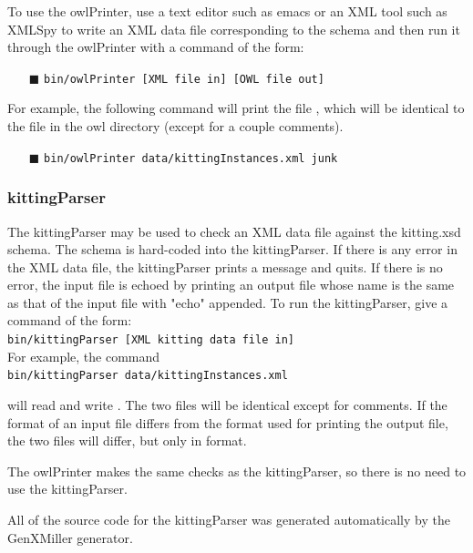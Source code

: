To use the owlPrinter, use a text editor such as emacs or an XML tool such as XMLSpy to write an XML data file corresponding to the  schema and then run it through the owlPrinter with a command of the form:
\begin{itemize}
 \item[\textcolor{BrickRed}{$\blacksquare$}] \texttt{bin/owlPrinter [XML file in] [OWL file out]}
\end{itemize}

For example, the following command will print the file , which will be identical to the  file in the owl directory (except for a couple comments).
\begin{itemize}
 \item[\textcolor{BrickRed}{$\blacksquare$}] \texttt{bin/owlPrinter data/kittingInstances.xml junk}
\end{itemize}




\subsubsection{kittingParser}
The kittingParser may be used to check an XML data file against the
kitting.xsd schema. The schema is hard-coded into the kittingParser.
If there is any error in the XML data file, the kittingParser prints
a message and quits. If there is no error, the input file is echoed by
printing an output file whose name is the same as that of the input file
with "echo" appended. To run the kittingParser, give a command of the
form:\\
\texttt{bin/kittingParser [XML kitting data file in]}\\

For example, the command\\

\texttt{bin/kittingParser data/kittingInstances.xml}

will read  and write . The
two files will be identical except for comments. If the format of an
input file differs from the format used for printing the output file,
the two files will differ, but only in format.

The owlPrinter makes the same checks as the kittingParser, so there is
no need to use the kittingParser.

All of the source code for the kittingParser was generated automatically
by the GenXMiller generator.

